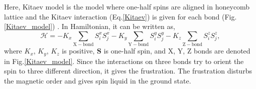 \documentclass[a4,10.5pt]{report}
\begin{document}
Here, Kitaev model is the model where one-half spins are aligned in honeycomb lattice and the Kitaev interaction (Eq.\ref{Kitaev}) is given for each bond (Fig.\ref{Kitaev_model})
\cite{kitaev2006anyons}.
In Hamiltonian, it can be written as,
\begin{equation}
\mathcal{H} = -K_x\sum_\mathrm{X-bond} S^x_iS^x_j - K_y\sum_\mathrm{Y-bond} S^y_iS^y_j - K_z\sum_\mathrm{Z-bond} S^z_iS^z_j,
\label{Kitaev_H}
\end{equation}
where $K_x$, $K_y$, $K_z$ is positive, $\bm{S}$ is one-half spin, and X, Y, Z bonds are denoted in Fig.\ref{Kitaev_model}.
Since the interactions on three bonds try to orient the spin to three different direction, it gives the frustration.
The frustration disturbs the magnetic order and gives spin liquid in the ground state.
\end{document}
